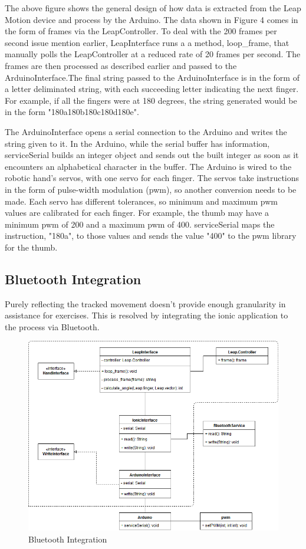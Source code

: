 \documentclass[a4paper,10pt]{article}
\begin{document}
            The above figure shows the general design of how data is extracted from the Leap Motion device and process by the Arduino. The data shown in Figure 4 comes in the form of frames via the LeapController. To deal with the 200 frames per second issue mention earlier, LeapInterface runs a a method, loop\_frame, that manually polls the LeapController at a reduced rate of 20 frames per second. The frames are then processed as described earlier and passed to the ArduinoInterface.The final string passed to the ArduinoInterface is in the form of a letter deliminated string, with each succeeding letter indicating the next finger. For example, if all the fingers were at 180 degrees, the string generated would be in the form "180a180b180c180d180e".

            The ArduinoInterface opens a serial connection to the Arduino and writes the string given to it. In the Arduino, while the serial buffer has information, serviceSerial builds an integer object and sends out the built integer as soon as it encounters an alphabetical character in the buffer. The Arduino is wired to the robotic hand's servos, with one servo for each finger. The servos take instructions in the form of pulse-width modulation (pwm), so another conversion needs to be made. Each servo has different tolerances, so minimum and maximum pwm values are calibrated for each finger. For example, the thumb may have a minimum pwm of 200 and a maximum pwm of 400. serviceSerial maps the instruction, "180a", to those values and sends the value "400" to the pwm library for the thumb.
            
        \subsection{Bluetooth Integration}
        	Purely reflecting the tracked movement doesn't provide enough granularity in assistance for exercises. This is resolved by integrating the ionic application to the process via Bluetooth. 
        	\begin{figure}[h]
            \centering
            \includegraphics[width=140mm, scale=1]{btDiagram}
            \caption{Bluetooth Integration}
            \end{figure}
            
\end{document}

